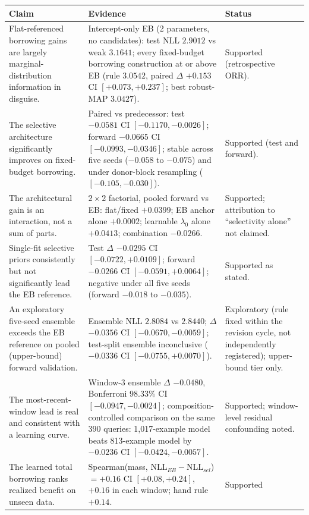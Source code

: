 \documentclass[11pt]{article}
\begin{document}
\begin{longtable}{p{} p{} p{}}
\toprule
\textbf{Claim} & \textbf{Evidence} & \textbf{Status} \\
\midrule
\endhead
Flat-referenced borrowing gains are largely marginal-distribution information
in disguise. & Intercept-only EB (2 parameters, no candidates): test NLL
$2.9012$ vs weak $3.1641$; every fixed-budget borrowing construction at or
above EB (rule $3.0542$, paired $\Delta$ $+0.153$ CI $[+0.073,+0.237]$; best
robust-MAP $3.0427$). & Supported (retrospective ORR). \\
The selective architecture significantly improves on fixed-budget borrowing.
& Paired vs predecessor: test $-0.0581$ CI $[-0.1170,-0.0026]$; forward
$-0.0665$ CI $[-0.0993,-0.0346]$; stable across five seeds ($-0.058$ to
$-0.075$) and under donor-block resampling ($[-0.105,-0.030]$). & Supported
(test and forward). \\
The architectural gain is an interaction, not a sum of parts. & $2\times2$
factorial, pooled forward vs EB: flat/fixed $+0.0399$; EB anchor alone
$+0.0002$; learnable $\lambda_0$ alone $+0.0413$; combination $-0.0266$. &
Supported; attribution to ``selectivity alone'' not claimed. \\
Single-fit selective priors consistently but not significantly lead the EB
reference. & Test $\Delta$ $-0.0295$ CI $[-0.0722,+0.0109]$; forward
$-0.0266$ CI $[-0.0591,+0.0064]$; negative under all five seeds (forward
$-0.018$ to $-0.035$). & Supported as stated. \\
An exploratory five-seed ensemble exceeds the EB reference on pooled
(upper-bound) forward validation. & Ensemble NLL $2.8084$ vs $2.8440$;
$\Delta$ $-0.0356$
CI $[-0.0670,-0.0059]$; test-split
ensemble inconclusive ($-0.0336$ CI $[-0.0755,+0.0070]$). & Exploratory
(rule fixed within the revision cycle, not independently registered);
upper-bound tier only. \\
The most-recent-window lead is real and consistent with a learning curve. &
Window-3 ensemble $\Delta$ $-0.0480$, Bonferroni $98.33\%$ CI
$[-0.0947,-0.0024]$; composition-controlled comparison on the same 390
queries: 1{,}017-example model beats 813-example model by $-0.0236$ CI
$[-0.0424,-0.0057]$. & Supported; window-level residual confounding noted. \\
The learned total borrowing ranks realized benefit on unseen data. &
Spearman(mass, $\mathrm{NLL}_{EB}-\mathrm{NLL}_{sel}$) $= +0.16$ CI
$[+0.08,+0.24]$, $+0.16$ in each window; hand rule $+0.14$. & Supported

\end{longtable}
\end{document}

